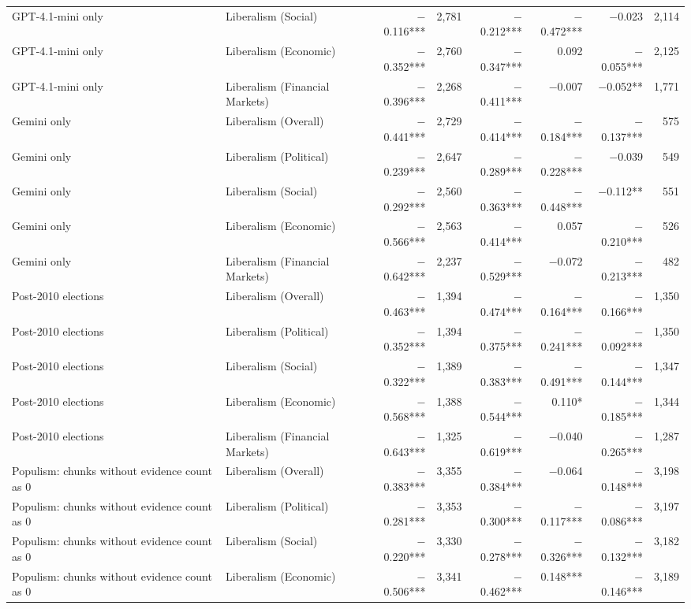 \begin{table}[ht]
{\begin{tabular}{llrrrrrr}
GPT-4.1-mini only & Liberalism (Social) & $-$0.116*** & 2,781 & $-$0.212*** & $-$0.472*** & $-$0.023 & 2,114 \\
GPT-4.1-mini only & Liberalism (Economic) & $-$0.352*** & 2,760 & $-$0.347*** & 0.092 & $-$0.055*** & 2,125 \\
GPT-4.1-mini only & Liberalism (Financial Markets) & $-$0.396*** & 2,268 & $-$0.411*** & $-$0.007 & $-$0.052** & 1,771 \\
Gemini only & Liberalism (Overall) & $-$0.441*** & 2,729 & $-$0.414*** & $-$0.184*** & $-$0.137*** & 575 \\
Gemini only & Liberalism (Political) & $-$0.239*** & 2,647 & $-$0.289*** & $-$0.228*** & $-$0.039 & 549 \\
Gemini only & Liberalism (Social) & $-$0.292*** & 2,560 & $-$0.363*** & $-$0.448*** & $-$0.112** & 551 \\
Gemini only & Liberalism (Economic) & $-$0.566*** & 2,563 & $-$0.414*** & 0.057 & $-$0.210*** & 526 \\
Gemini only & Liberalism (Financial Markets) & $-$0.642*** & 2,237 & $-$0.529*** & $-$0.072 & $-$0.213*** & 482 \\
Post-2010 elections & Liberalism (Overall) & $-$0.463*** & 1,394 & $-$0.474*** & $-$0.164*** & $-$0.166*** & 1,350 \\
Post-2010 elections & Liberalism (Political) & $-$0.352*** & 1,394 & $-$0.375*** & $-$0.241*** & $-$0.092*** & 1,350 \\
Post-2010 elections & Liberalism (Social) & $-$0.322*** & 1,389 & $-$0.383*** & $-$0.491*** & $-$0.144*** & 1,347 \\
Post-2010 elections & Liberalism (Economic) & $-$0.568*** & 1,388 & $-$0.544*** & 0.110* & $-$0.185*** & 1,344 \\
Post-2010 elections & Liberalism (Financial Markets) & $-$0.643*** & 1,325 & $-$0.619*** & $-$0.040 & $-$0.265*** & 1,287 \\
Populism: chunks without evidence count as 0 & Liberalism (Overall) & $-$0.383*** & 3,355 & $-$0.384*** & $-$0.064 & $-$0.148*** & 3,198 \\
Populism: chunks without evidence count as 0 & Liberalism (Political) & $-$0.281*** & 3,353 & $-$0.300*** & $-$0.117*** & $-$0.086*** & 3,197 \\
Populism: chunks without evidence count as 0 & Liberalism (Social) & $-$0.220*** & 3,330 & $-$0.278*** & $-$0.326*** & $-$0.132*** & 3,182 \\
Populism: chunks without evidence count as 0 & Liberalism (Economic) & $-$0.506*** & 3,341 & $-$0.462*** & 0.148*** & $-$0.146*** & 3,189 \\

\end{tabular}}
\end{table}
